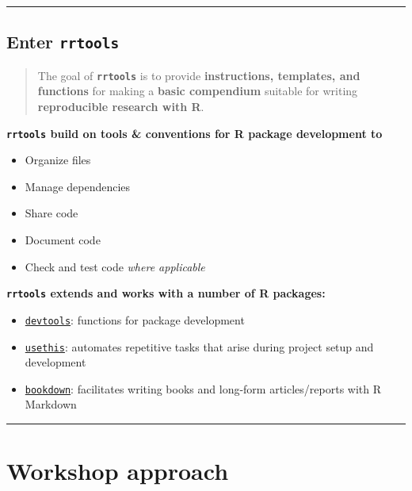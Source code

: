 \documentclass[
  letterpaper,
  DIV=11,
  numbers=noendperiod]{scrreprt}
\providecommand{\tightlist}{%
  \setlength{\itemsep}{0pt}\setlength{\parskip}{0pt}}\usepackage{longtable,booktabs,array}
\begin{document}
\begin{center}\rule{0.5\linewidth}{0.5pt}\end{center}

\hypertarget{enter-rrtools}{%
\section*{\texorpdfstring{Enter
\texttt{rrtools}}{Enter rrtools}}\label{enter-rrtools}}

\begin{quote}
The goal of \textbf{\texttt{rrtools}} is to provide
\textbf{instructions, templates, and functions} for making a
\textbf{basic compendium} suitable for writing \textbf{reproducible
research with R}.
\end{quote}

\textbf{\texttt{rrtools} build on tools \& conventions for R package
development to}

\begin{itemize}
\tightlist
\item
  Organize files
\item
  Manage dependencies
\item
  Share code
\item
  Document code
\item
  Check and test code \emph{where applicable}
\end{itemize}

\textbf{\texttt{rrtools} extends and works with a number of R packages:}

\begin{itemize}
\item
  \href{https://cran.r-project.org/package=devtools}{\texttt{devtools}}:
  functions for package development
\item
  \href{https://www.tidyverse.org/articles/2017/11/usethis-1.0.0/}{\texttt{usethis}}:
  automates repetitive tasks that arise during project setup and
  development
\item
  \href{https://bookdown.org/}{\texttt{bookdown}}: facilitates writing
  books and long-form articles/reports with R Markdown
\end{itemize}

\begin{center}\rule{0.5\linewidth}{0.5pt}\end{center}


\hypertarget{workshop-approach}{%
\chapter*{Workshop approach}\label{workshop-approach}}
\end{document}
